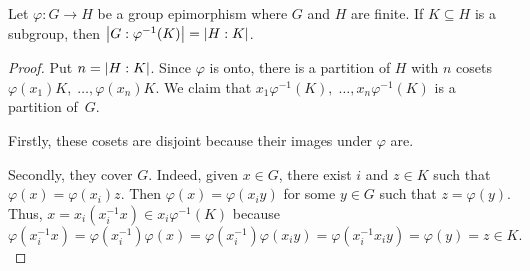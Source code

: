 \begin{cor}\label{index-of-preimage}
    Let $\varphi\colon G\to H$ be a group epimorphism where $G$ and $H$ are finite. If\/ $K\subseteq H$ is a subgroup, then $\left\vert{G:\varphi^{-1}(K)}\right\vert=\left\vert{H:K}\right\vert$.
\end{cor}

\begin{proof} Put $n=\left\vert{H:K}\right\vert$. Since $\varphi$ is onto, there is a partition of $H$ with $n$ cosets $\varphi(x_1)K,\;\dots,\varphi(x_n)K$. We claim that $x_1\varphi^{-1}(K),\;\dots,x_n\varphi^{-1}(K)$ is a partition of~$G$.

Firstly, these cosets are disjoint because their images under $\varphi$ are.

Secondly, they cover $G$. Indeed, given $x\in G$, there exist $i$ and $z\in K$ such that $\varphi(x)=\varphi(x_i)z$. Then $\varphi(x)=\varphi(x_iy)$ for some $y\in G$ such that $z=\varphi(y)$. Thus, $x=x_i(x_i^{-1}x)\in x_i\varphi^{-1}(K)$ because 
$$
    \varphi(x_i^{-1}x) =\varphi(x_i^{-1})\varphi(x)
        =\varphi(x_i^{-1})\varphi(x_iy)
        =\varphi(x_i^{-1}x_iy)
        =\varphi(y)=z\in K.
$$
 \end{proof}


